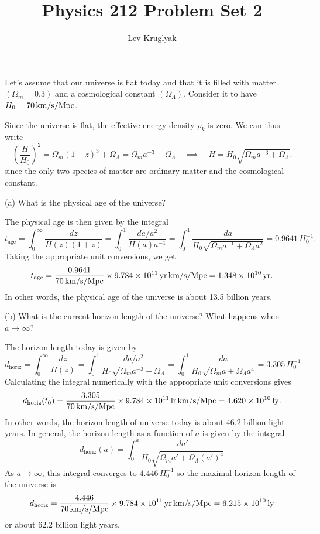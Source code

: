\documentclass{lkx_pset}
\title{Physics 212 Problem Set 2}
\author{Lev Kruglyak}
\begin{document}
\maketitle

\begin{problem}{1}
Let's assume that our universe is flat today and that it is filled with matter $(\Omega_m=0.3)$ and a cosmological constant $(\Omega_\Lambda)$. Consider it to have $H_0=\Hsi{70}$.
\end{problem}
\begin{solution}
	Since the universe is flat, the effective energy density $\rho_k$ is zero. We can thus write
	\[
		\left(\frac{H}{H_0}\right)^2 = \Omega_m (1+z)^3 + \Omega_\Lambda = \Omega_m a^{-3} + \Omega_\Lambda\quad\implies\quad H = H_0\sqrt{\Omega_m a^{-3} + \Omega_\Lambda}.
	\]
	since the only two species of matter are ordinary matter and the cosmological constant.
	\begin{part}{(a)}
		What is the physical age of the universe?
	\end{part}

	The physical age is then given by the integral
	\[
		t_{\textrm{age}} = \int_0^\infty \frac{dz}{H(z)(1+z)} = \int_0^1\frac{da/a^2}{H(a)a^{-1}} = \int_0^1 \frac{da}{H_0\sqrt{\Omega_m a^{-1} + \Omega_\Lambda a^2}} = 0.9641\, H_0^{-1}.
	\]
	Taking the appropriate unit conversions, we get
	\[
		t_{\textrm{age}} = \frac{0.9641}{\Hsi{70}}\times \Hyrsi{9.784e11}=\yrsi{1.348e10}.
	\]
	In other words, the physical age of the universe is about 13.5 billion years.

	\begin{part}{(b)}
		What is the current horizon length of the universe? What happens when $a\to \infty$?
	\end{part}
	The horizon length today is given by
	\[
		d_{\textrm{horiz}} = \int_0^\infty \frac{dz}{H(z)} = \int_0^1 \frac{da/a^2}{H_0\sqrt{\Omega_m a^{-3} + \Omega_\Lambda}} = \int_0^1 \frac{da}{H_0\sqrt{\Omega_m a + \Omega_{\Lambda} a^4}}=3.305\, H_0^{-1}
	\]
	Calculating the integral numerically with the appropriate unit conversions gives
	\[
		d_{\textrm{horiz}}(t_0) = \frac{3.305}{\Hsi{70}}\times \Hlysi{9.784e11} = \lysi{4.620e10}.
	\]
	In other words, the horizon length of universe today is about 46.2 billion light years.
	In general, the horizon length as a function of $a$ is given by the integral
	\[
		d_{\textrm{horiz}}(a)= \int_0^{a} \frac{da'}{H_0\sqrt{\Omega_m a' + \Omega_\Lambda (a')^4}}
	\]
	As $a\to\infty$, this integral converges to $4.446\,H_0^{-1}$ so the maximal horizon length of the universe is
	\[
		d_{\textrm{horiz}} = \frac{4.446}{\Hsi{70}}\times \Hyrsi{9.784e11} = \lysi{6.215e10}
	\]
	or about 62.2 billion light years.
\end{solution}
\end{document}
